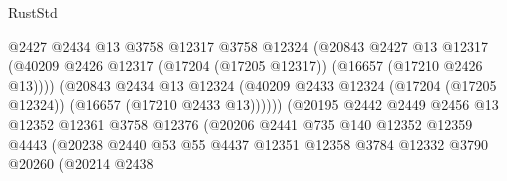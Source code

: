 \begin{lexlean}{RustStd}
\begin{coremodule}
                                        @2427
                                        @2434
                                        @13
                                        @3758
                                        @12317
                                        @3758
                                        @12324
                                        (@20843
                                          @2427
                                          @13
                                          @12317
                                          (@40209
                                            @2426
                                            @12317
                                            (@17204 (@17205 @12317))
                                            (@16657 (@17210 @2426 @13))))
                                        (@20843
                                          @2434
                                          @13
                                          @12324
                                          (@40209
                                            @2433
                                            @12324
                                            (@17204 (@17205 @12324))
                                            (@16657 (@17210 @2433 @13))))))
                                    (@20195
                                      @2442
                                      @2449
                                      @2456
                                      @13
                                      @12352
                                      @12361
                                      @3758
                                      @12376
                                      (@20206
                                        @2441
                                        @735
                                        @140
                                        @12352
                                        @12359
                                        @4443
                                        (@20238
                                          @2440
                                          @53
                                          @55
                                          @4437
                                          @12351
                                          @12358
                                          @3784
                                          @12332
                                          @3790
                                          @20260
                                          (@20214
                                            @2438

\end{coremodule}
\end{lexlean}
